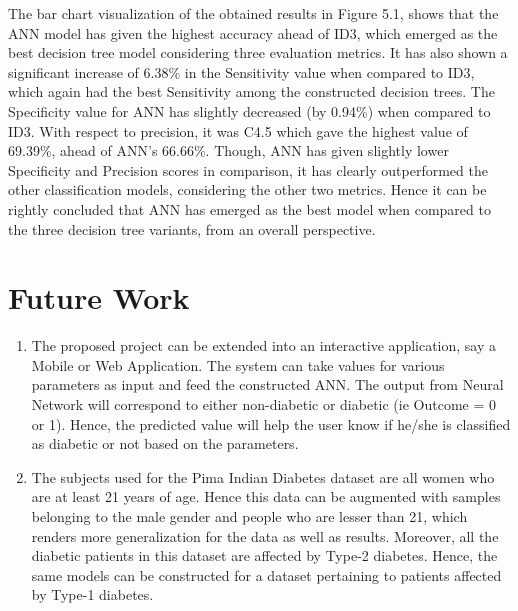 The bar chart visualization of the obtained results in Figure 5.1, shows that the ANN model has given the highest accuracy ahead of ID3, which emerged as the best decision tree model considering three evaluation metrics. It has also shown a significant increase of 6.38\% in the Sensitivity value when compared to ID3, which again had the best Sensitivity among the constructed decision trees. The Specificity value for ANN has slightly decreased (by 0.94\%) when compared to ID3. With respect to precision, it was C4.5 which gave the highest value of 69.39\%, ahead of ANN’s 66.66\%. Though, ANN has given slightly lower Specificity and Precision scores in comparison, it has clearly outperformed the other classification models, considering the other two metrics. Hence it can be rightly concluded that ANN has emerged as the best model when compared to the three decision tree variants, from an overall perspective.

\section{Future Work}
\begin{enumerate}
    \item The proposed project can be extended into an interactive application, say a Mobile or Web Application. The system can take values for various parameters as input and feed the constructed ANN. The output from Neural Network will correspond to either non-diabetic or diabetic (ie Outcome = 0 or 1). Hence, the predicted value will help the user know if he/she is classified as diabetic or not based on the parameters. 
    \item The subjects used for the Pima Indian Diabetes dataset are all women who are at least 21 years of age. Hence this data can be augmented with samples belonging to the male gender and people who are lesser than 21, which renders more generalization for the data as well as results. Moreover, all the diabetic patients in this dataset are affected by Type-2 diabetes. Hence, the same models can be constructed for a dataset pertaining to patients affected by Type-1 diabetes.
\end{enumerate}